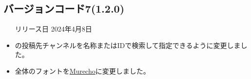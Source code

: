 \subsection*{バージョンコード7(1.2.0)}
\begin{itemize}
    \item[リリース日] 2024年4月8日
\end{itemize}

\new \par
\change
\begin{itemize}
    \item \nowplaying の投稿先チャンネルを名称またはIDで検索して指定できるように変更しました。
    \item \bj 全体のフォントを\href{https://fonts.google.com/specimen/Murecho?subset=japanese}{Murecho}に変更しました。
\end{itemize}

\fix